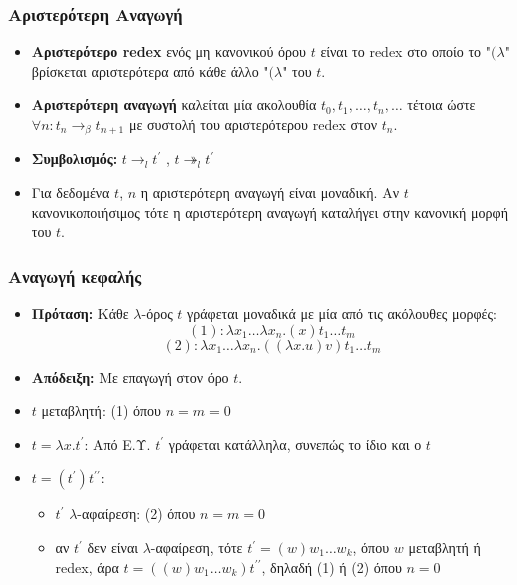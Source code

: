 \documentclass{beamer}
\begin{document}
\begin{frame}
  \frametitle{Αριστερότερη Αναγωγή}
  \begin{itemize}
  \item \textbf{Αριστερότερο redex} ενός μη κανονικού όρου $t$ είναι
    το redex στο οποίο το "$(\lambda$" βρίσκεται αριστερότερα από κάθε
    άλλο "$(\lambda$" του $t$.
  \item \textbf{Αριστερότερη αναγωγή} καλείται μία ακολουθία $t_0,
    t_1, \ldots, t_n, \ldots$ τέτοια ώστε $\forall n: t_n \rightarrow
    _\beta t_{n+1}$ με συστολή του αριστερότερου redex στον
    $t_n$.
  \item \textbf{Συμβολισμός:} $t \rightarrow _l t^\prime$ , $t
    \twoheadrightarrow _l t^\prime$
  \item Για δεδομένα $t$, $n$ η αριστερότερη αναγωγή είναι
    μοναδική. Αν $t$ κανονικοποιήσιμος τότε η αριστερότερη αναγωγή
    καταλήγει στην κανονική μορφή του $t$.
  \end{itemize}
\end{frame}

\begin{frame}
  \frametitle{Αναγωγή κεφαλής}
  \begin{itemize}
  \item \textbf{Πρόταση:} Κάθε $\lambda$-όρος $t$ γράφεται μοναδικά με
    μία από τις ακόλουθες μορφές:
    $$(1): \lambda x_1 \ldots \lambda x_n . (x) t_1 \ldots t_m$$ 
    $$(2): \lambda x_1 \ldots \lambda x_n . ((\lambda x . u) v) t_1
    \ldots t_m$$ \pause
  \item \textbf{Απόδειξη:} Με επαγωγή στον όρο $t$.
  \item $t$ μεταβλητή: (1) όπου $n=m=0$ \pause
  \item $t = \lambda x . t^\prime$: Από Ε.Υ. $t^\prime$ γράφεται
    κατάλληλα, συνεπώς το ίδιο και ο $t$ \pause
  \item $t = (t^\prime) t^{\prime \prime}$:
    \begin{itemize}
    \item $t^\prime$ $\lambda$-αφαίρεση: (2) όπου $n=m=0$ \pause
    \item αν $t^\prime$ δεν είναι $\lambda$-αφαίρεση, τότε $t^\prime =
      (w) w_1 \ldots w_k$, όπου $w$ μεταβλητή ή redex, άρα $t = ((w)
      w_1 \ldots w_k) t^{\prime \prime}$, δηλαδή (1) ή (2) όπου $n=0$
    \end{itemize}
  \end{itemize}
\end{frame}
\end{document}
